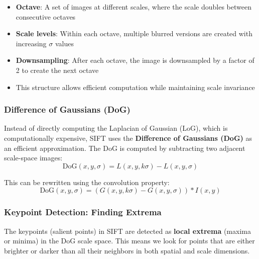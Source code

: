 \documentclass[11pt,a4paper]{article}
\theoremstyle{definition}
\theoremstyle{plain}
\theoremstyle{remark}
\begin{document}
\begin{tcolorbox}[colback=green!5!white,colframe=green!75!black,title=\textbf{Image Pyramid Structure}]
\begin{itemize}
    \item \textbf{Octave}: A set of images at different scales, where the scale doubles between consecutive octaves
    \item \textbf{Scale levels}: Within each octave, multiple blurred versions are created with increasing $\sigma$ values
    \item \textbf{Downsampling}: After each octave, the image is downsampled by a factor of 2 to create the next octave
    \item This structure allows efficient computation while maintaining scale invariance
\end{itemize}
\end{tcolorbox}

\subsubsection{Difference of Gaussians (DoG)}

Instead of directly computing the Laplacian of Gaussian (LoG), which is computationally expensive, SIFT uses the \textbf{Difference of Gaussians (DoG)} as an efficient approximation. The DoG is computed by subtracting two adjacent scale-space images:
\begin{equation} \label{eq:dog_definition}
    \text{DoG}(x, y, \sigma) = L(x, y, k\sigma) - L(x, y, \sigma)
\end{equation}

This can be rewritten using the convolution property:
\begin{equation} \label{eq:dog_convolution}
    \text{DoG}(x, y, \sigma) = (G(x, y, k\sigma) - G(x, y, \sigma)) * I(x, y)
\end{equation}

\subsubsection{Keypoint Detection: Finding Extrema}

The keypoints (salient points) in SIFT are detected as \textbf{local extrema} (maxima or minima) in the DoG scale space. This means we look for points that are either brighter or darker than all their neighbors in both spatial and scale dimensions.
\end{document}
